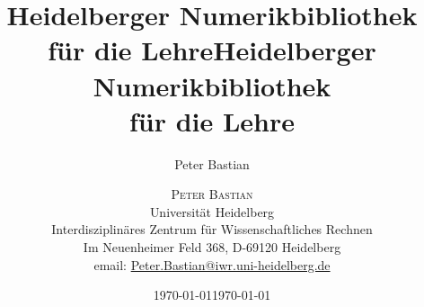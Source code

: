 
{
\theoremstyle{definition}
}
{
\theoremstyle{definition}
}

\newtheorem{Def}{Definition}[section]
\newtheorem{Bsp}[Def]{Beispiel}
\newtheorem{Bem}[Def]{Bemerkung}
\newtheorem{Lem}[Def]{Lemma}
\newtheorem{Rgl}[Def]{Regel}
\newtheorem{Sat}[Def]{Satz}
\newtheorem{HSatz}[Def]{Hilfssatz}
\newtheorem{Kor}[Def]{Korollar}
\newtheorem{Folg}[Def]{Folgerung}
\newtheorem{Beob}[Def]{Beobachtung}
\newtheorem{wissen}[Def]{Wissen}
\newtheorem*{geschichte}{Geschichte}




{
  \title[HDNum]{Heidelberger Numerikbibliothek für die Lehre}
  \author{Peter Bastian}
  \date{\today}
}
{
  \title{Heidelberger Numerikbibliothek \\ für die Lehre}
  \author{\textsc{Peter Bastian}\\
    Universität Heidelberg\\
    Interdisziplinäres Zentrum für Wissenschaftliches Rechnen\\
    Im Neuenheimer Feld 368, D-69120 Heidelberg\\
	email: \url{Peter.Bastian@iwr.uni-heidelberg.de}
  }
  \date{\today}
}

